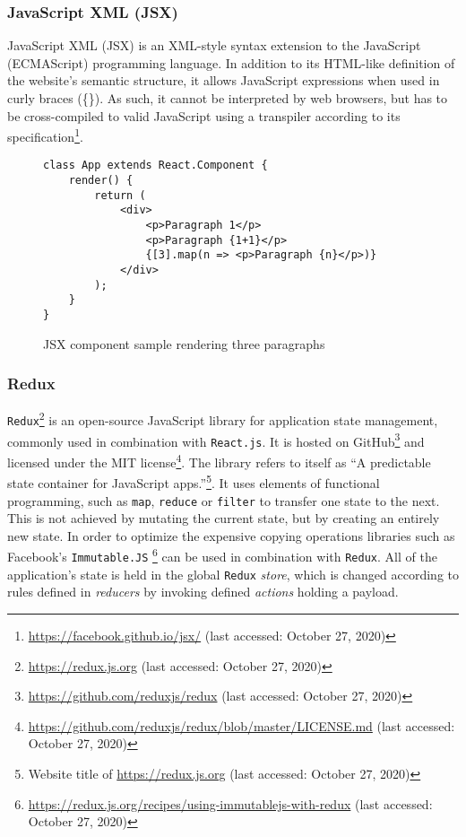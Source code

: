 \subsubsection{JavaScript XML (JSX)}
\label{subsub:basics-jsx}

JavaScript XML (JSX) is an XML-style syntax extension to the JavaScript (ECMAScript) programming language.
In addition to its HTML-like definition of the website's semantic structure, it allows JavaScript expressions when used in curly braces (\{\}).
As such, it cannot be interpreted by web browsers, but has to be cross-compiled to valid JavaScript using a transpiler according to its specification\footnote{\url{https://facebook.github.io/jsx/} (last accessed: October 27, 2020)}.


\begin{figure}[H]
\begin{verbatim}
class App extends React.Component {
    render() {
        return (
            <div>
                <p>Paragraph 1</p>
                <p>Paragraph {1+1}</p>
                {[3].map(n => <p>Paragraph {n}</p>)}
            </div>
        );
    }
}
\end{verbatim}
\caption{JSX component sample rendering three paragraphs}
\end{figure}


\subsubsection{Redux}
\label{subsub:basics-redux}

\texttt{Redux}\footnote{\url{https://redux.js.org} (last accessed: October 27, 2020)} is an open-source JavaScript library for application state management, commonly used in combination with \texttt{React.js}.
It is hosted on GitHub\footnote{\url{https://github.com/reduxjs/redux} (last accessed: October 27, 2020)} and licensed under the MIT license\footnote{\url{https://github.com/reduxjs/redux/blob/master/LICENSE.md} (last accessed: October 27, 2020)}.
The library refers to itself as ``A predictable state container for JavaScript apps.''\footnote{Website title of \url{https://redux.js.org} (last accessed: October 27, 2020)}. It uses elements of functional programming, such as \texttt{map}, \texttt{reduce} or \texttt{filter} to transfer one state to the next. This is not achieved by mutating the current state, but by creating an entirely new state. In order to optimize the expensive copying operations libraries such as Facebook's \texttt{Immutable.JS} \footnote{\url{https://redux.js.org/recipes/using-immutablejs-with-redux} (last accessed: October 27, 2020)} can be used in combination with \texttt{Redux}. All of the application's state is held in the global \texttt{Redux} \textit{store}, which is changed according to rules defined in \textit{reducers} by invoking defined \textit{actions} holding a payload.